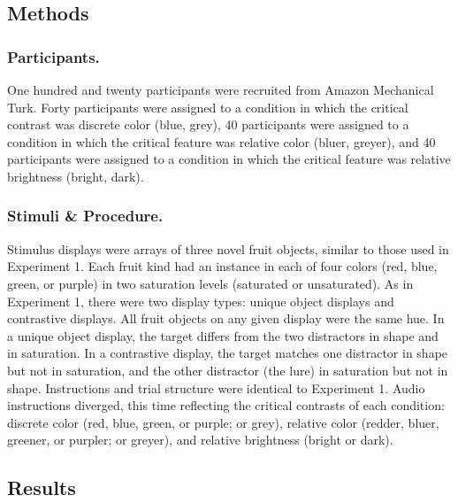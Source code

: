 \documentclass[10pt, letterpaper]{article}
\begin{document}
\subsection{Methods}\label{methods}

\subsubsection{Participants.}\label{participants.-1}

One hundred and twenty participants were recruited from Amazon
Mechanical Turk. Forty participants were assigned to a condition in
which the critical contrast was discrete color (blue, grey), 40
participants were assigned to a condition in which the critical feature
was relative color (bluer, greyer), and 40 participants were assigned to
a condition in which the critical feature was relative brightness
(bright, dark).

\subsubsection{Stimuli \& Procedure.}\label{stimuli-procedure.}

Stimulus displays were arrays of three novel fruit objects, similar to
those used in Experiment 1. Each fruit kind had an instance in each of
four colors (red, blue, green, or purple) in two saturation levels
(saturated or unsaturated). As in Experiment 1, there were two display
types: unique object displays and contrastive displays. All fruit
objects on any given display were the same hue. In a unique object
display, the target differs from the two distractors in shape and in
saturation. In a contrastive display, the target matches one distractor
in shape but not in saturation, and the other distractor (the lure) in
saturation but not in shape. Instructions and trial structure were
identical to Experiment 1. Audio instructions diverged, this time
reflecting the critical contrasts of each condition: discrete color
(red, blue, green, or purple; or grey), relative color (redder, bluer,
greener, or purpler; or greyer), and relative brightness (bright or
dark).

\subsection{Results}\label{results-1}
\end{document}
